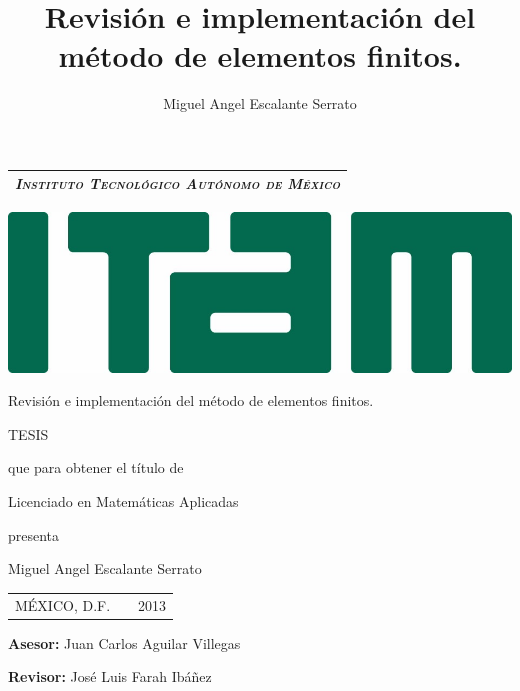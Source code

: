 \documentclass[12pt,spanish,oneside]{book}
\author{Miguel Angel Escalante Serrato}
\title{Revisión e implementación del método de elementos finitos.}
\theoremstyle{plain}
\numberwithin{equation}{chapter}
\theoremstyle{definition}
\theoremstyle{remark}
\begin{document}
%
\newpage

\thispagestyle{empty}

\setcounter{page}{1}
\begin{center}
\begin{tabular}{c}
\hline
 \large \emph{\textsc{Instituto Tecnológico Autónomo de México}} \\
 
\hline
\end{tabular}

\vspace{10pt}

\centering
\includegraphics[width=0.8\linewidth]{img/Logo_ITAM.jpeg}

\vspace{20pt}


\Large Revisión e implementación del método de elementos finitos.



\vspace{30pt}

\normalsize TESIS

\vspace{12pt}

que para obtener el título de

\vspace{12pt}

Licenciado en Matemáticas Aplicadas

\vspace{12pt}

presenta

\vspace{12pt}

Miguel Angel Escalante Serrato

\vspace{32pt}

\begin{tabular}{lcr}
MÉXICO, D.F. & \hspace{80pt} & 2013
\end{tabular}

\textbf{Asesor:} Juan Carlos Aguilar Villegas

\textbf{Revisor:} José Luis Farah Ibáñez
\end{center}
\end{document}
